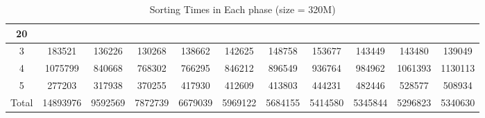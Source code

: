 \documentclass[11pt]{article}
\begin{document}
\begin{table}[htbp]
{\begin{tabular}{|c|cccccccccc|}
                20 \\ \hline
                3 &
                \multicolumn{1}{c|}{183521} &
                \multicolumn{1}{c|}{136226} &
                \multicolumn{1}{c|}{130268} &
                \multicolumn{1}{c|}{138662} &
                \multicolumn{1}{c|}{142625} &
                \multicolumn{1}{c|}{148758} &
                \multicolumn{1}{c|}{153677} &
                \multicolumn{1}{c|}{143449} &
                \multicolumn{1}{c|}{143480} &
                139049 \\ \hline
                4 &
                \multicolumn{1}{c|}{1075799} &
                \multicolumn{1}{c|}{840668} &
                \multicolumn{1}{c|}{768302} &
                \multicolumn{1}{c|}{766295} &
                \multicolumn{1}{c|}{846212} &
                \multicolumn{1}{c|}{896549} &
                \multicolumn{1}{c|}{936764} &
                \multicolumn{1}{c|}{984962} &
                \multicolumn{1}{c|}{1061393} &
                1130113 \\ \hline
                5 &
                \multicolumn{1}{c|}{277203} &
                \multicolumn{1}{c|}{317938} &
                \multicolumn{1}{c|}{370255} &
                \multicolumn{1}{c|}{417930} &
                \multicolumn{1}{c|}{412609} &
                \multicolumn{1}{c|}{413803} &
                \multicolumn{1}{c|}{444231} &
                \multicolumn{1}{c|}{482446} &
                \multicolumn{1}{c|}{528577} &
                508934 \\ \hline
                Total &
                \multicolumn{1}{c|}{14893976} &
                \multicolumn{1}{c|}{9592569} &
                \multicolumn{1}{c|}{7872739} &
                \multicolumn{1}{c|}{6679039} &
                \multicolumn{1}{c|}{5969122} &
                \multicolumn{1}{c|}{5684155} &
                \multicolumn{1}{c|}{5414580} &
                \multicolumn{1}{c|}{5345844} &
                \multicolumn{1}{c|}{5296823} &
                5340630 \\ \hline
            \end{tabular}%
        }
        \caption{Sorting Times in Each phase (size = 320M)}
        \label{tab:sorting-times-in-phase}
    \end{table}
\end{document}
